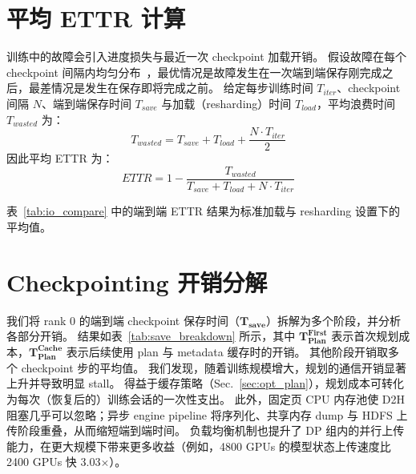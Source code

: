 \section{平均 ETTR 计算}\label{sec:ettr_cal}
训练中的故障会引入进度损失与最近一次 checkpoint 加载开销。
假设故障在每个 checkpoint 间隔内均匀分布~\cite{gemini-sys}，最优情况是故障发生在一次端到端保存刚完成之后，最差情况是发生在保存即将完成之前。
给定每步训练时间 $T_{iter}$、checkpoint 间隔 $N$、端到端保存时间 $T_{save}$ 与加载（resharding）时间 $T_{load}$，平均浪费时间 $T_{wasted}$ 为：
\begin{equation}
    T_{wasted} = T_{save} + T_{load} + \frac{N \cdot T_{iter}}{2}
\end{equation}
因此平均 ETTR 为：
\begin{equation}
    ETTR = 1 - \frac{T_{wasted}}{T_{save} + T_{load} + N\cdot T_{iter}}
\end{equation}

表~\ref{tab:io_compare} 中的端到端 ETTR 结果为标准加载与 resharding 设置下的平均值。



\section{Checkpointing 开销分解}
\label{sec:save_breakdown}
我们将 rank 0 的端到端 checkpoint 保存时间（$\mathbf{T_{save}}$）拆解为多个阶段，并分析各部分开销。
结果如表~\ref{tab:save_breakdown} 所示，其中 $\mathbf{T_{Plan}^{First}}$ 表示首次规划成本，$\mathbf{T_{Plan}^{Cache}}$ 表示后续使用 plan 与 metadata 缓存时的开销。
其他阶段开销取多个 checkpoint 步的平均值。
我们发现，随着训练规模增大，规划的通信开销显著上升并导致明显 stall。
得益于缓存策略（Sec.~\ref{sec:opt_plan}），规划成本可转化为每次（恢复后的）训练会话的一次性支出。
此外，固定页 CPU 内存池使 D2H 阻塞几乎可以忽略；异步 engine pipeline 将序列化、共享内存 dump 与 HDFS 上传阶段重叠，从而缩短端到端时间。
负载均衡机制也提升了 DP 组内的并行上传能力，在更大规模下带来更多收益（例如，4800 GPUs 的模型状态上传速度比 2400 GPUs 快 3.03$\times$）。

